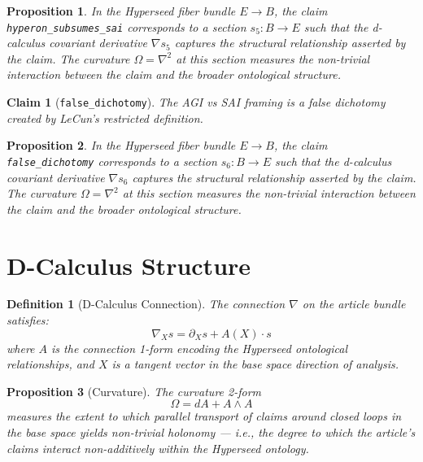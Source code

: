 \documentclass{article}
\newtheorem{claim}{Claim}
\newtheorem{definition}{Definition}
\newtheorem{proposition}{Proposition}
\begin{document}
\begin{proposition}
In the Hyperseed fiber bundle $E \to B$, the claim \texttt{hyperon_subsumes_sai} corresponds to a section $s_5: B \to E$ such that the d-calculus covariant derivative $\nabla s_5$ captures the structural relationship asserted by the claim. The curvature $\Omega = \nabla^2$ at this section measures the non-trivial interaction between the claim and the broader ontological structure.
\end{proposition}

\begin{claim}[\texttt{false_dichotomy}]
The AGI vs SAI framing is a false dichotomy created by LeCun's restricted definition.
\end{claim}

\begin{proposition}
In the Hyperseed fiber bundle $E \to B$, the claim \texttt{false_dichotomy} corresponds to a section $s_6: B \to E$ such that the d-calculus covariant derivative $\nabla s_6$ captures the structural relationship asserted by the claim. The curvature $\Omega = \nabla^2$ at this section measures the non-trivial interaction between the claim and the broader ontological structure.
\end{proposition}

\section{D-Calculus Structure}

\begin{definition}[D-Calculus Connection]
The connection $\nabla$ on the article bundle satisfies:
\begin{equation}
  \nabla_X s = \partial_X s + A(X) \cdot s
\end{equation}
where $A$ is the connection 1-form encoding the Hyperseed ontological relationships, and $X$ is a tangent vector in the base space direction of analysis.
\end{definition}

\begin{proposition}[Curvature]
The curvature 2-form
\begin{equation}
  \Omega = dA + A \wedge A
\end{equation}
measures the extent to which parallel transport of claims around closed loops in the base space yields non-trivial holonomy --- i.e., the degree to which the article's claims interact non-additively within the Hyperseed ontology.
\end{proposition}
\end{document}
